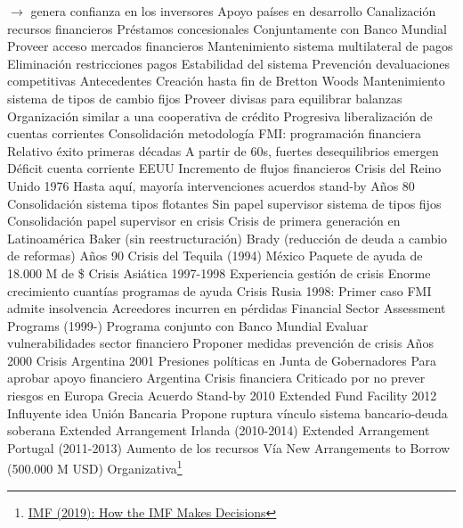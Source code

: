\documentclass{nuevotema}
\begin{document}
\begin{esquemal}
				\4[] $\to$ genera confianza en los inversores
			\3 Apoyo países en desarrollo
				\4 Canalización recursos financieros
				\4 Préstamos concesionales
				\4 Conjuntamente con Banco Mundial
				\4 Proveer acceso mercados financieros
			\3 Mantenimiento sistema multilateral de pagos
				\4 Eliminación restricciones pagos
				\4 Estabilidad del sistema
				\4 Prevención devaluaciones competitivas
		\2 Antecedentes
			\3 Creación hasta fin de Bretton Woods
				\4 Mantenimiento sistema de tipos de cambio fijos
				\4[] Proveer divisas para equilibrar balanzas
				\4[] Organización similar a una cooperativa de crédito
				\4 Progresiva liberalización de cuentas corrientes
				\4 Consolidación metodología FMI: programación financiera
				\4 Relativo éxito primeras décadas
				\4 A partir de 60s, fuertes desequilibrios emergen
				\4[] Déficit cuenta corriente EEUU
				\4[] Incremento de flujos financieros
				\4 Crisis del Reino Unido 1976
				\4 Hasta aquí, mayoría intervenciones acuerdos stand-by
			\3 Años 80
				\4 Consolidación sistema tipos flotantes
				\4 Sin papel supervisor sistema de tipos fijos
				\4 Consolidación papel supervisor en crisis
				\4 Crisis de primera generación en Latinoamérica
				\4 Baker (sin reestructuración)
				\4 Brady (reducción de deuda a cambio de reformas)
			\3 Años 90
				\4 Crisis del Tequila (1994) México
				\4[] Paquete de ayuda de 18.000 M de \$
				\4 Crisis Asiática 1997-1998
				\4[] Experiencia gestión de crisis
				\4[] Enorme crecimiento cuantías programas de ayuda
				\4 Crisis Rusia 1998:
				\4[] Primer caso FMI admite insolvencia
				\4[] Acreedores incurren en pérdidas
				\4 Financial Sector Assessment Programs (1999-)
				\4[] Programa conjunto con Banco Mundial
				\4[] Evaluar vulnerabilidades sector financiero
				\4[] Proponer medidas prevención de crisis
			\3 Años 2000
				\4 Crisis Argentina 2001
				\4[] Presiones políticas en Junta de Gobernadores
				\4[] Para aprobar apoyo financiero Argentina
			\3 Crisis financiera
				\4 Criticado por no prever riesgos en Europa
				\4 Grecia
				\4[] Acuerdo Stand-by 2010
				\4[] Extended Fund Facility 2012
				\4 Influyente idea Unión Bancaria
				\4 Propone ruptura vínculo sistema bancario-deuda soberana
				\4 Extended Arrangement Irlanda (2010-2014)
				\4 Extended Arrangement Portugal (2011-2013)
				\4 Aumento de los recursos
				\4[] Vía New Arrangements to Borrow (500.000 M USD)
	\1 
		\2 Organizativa\footnote{\href{https://www.imf.org/en/About/Factsheets/Sheets/2016/07/27/15/24/How-the-IMF-Makes-Decisions}{IMF (2019): How the IMF Makes Decisions}}

\end{esquemal}
\end{document}
